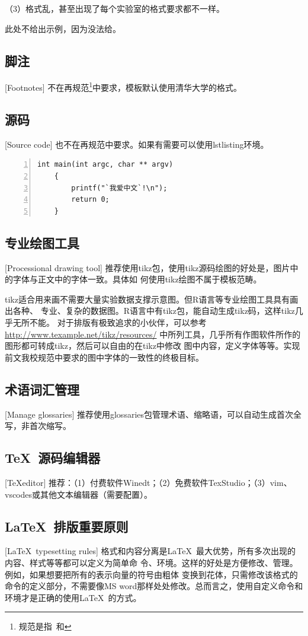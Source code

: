 （3）格式乱，甚至出现了每个实验室的格式要求都不一样。

此处不给出示例，因为没法给。

\subsection{脚注}[Footnotes]
不在再规范\footnote{规范是指\PGR\ 和\UGR}中要求，模板默认使用清华大学的格式。

\subsection{源码}[Source code]
也不在再规范中要求。如果有需要可以使用lstlisting环境。

\begin{lstlisting}[flexiblecolumns,numbers=left,language={[ANSI]C}]
    int main(int argc, char ** argv)
    {
        printf("`我爱中文`!\n");
        return 0;
    }
\end{lstlisting}

\subsection{专业绘图工具}[Processional drawing tool]
\label{drawtool}
推荐使用tikz包，使用tikz源码绘图的好处是，图片中的字体与正文中的字体一致。具体如
何使用tikz绘图不属于模板范畴。

tikz适合用来画不需要大量实验数据支撑示意图。但R语言等专业绘图工具具有画出各种、
专业、复杂的数据图。R语言中有tikz包，能自动生成tikz码，这样tikz几乎无所不能。
对于排版有极致追求的小伙伴，可以参考
\href{http://www.texample.net/tikz/resources/}{http://www.texample.net/tikz/resources/}
中所列工具，几乎所有作图软件所作的图形都可转成tikz，然后可以自由的在tikz中修改
图中内容，定义字体等等。实现前文我校规范中要求的图中字体的一致性的终极目标。


\subsection{术语词汇管理}[Manage glossaries]
推荐使用glossaries包管理术语、缩略语，可以自动生成首次全写，非首次缩写。

\subsection{\TeX\ 源码编辑器}[\TeX editor]
推荐：（1）付费软件Winedt；（2）免费软件TexStudio；（3）vim、vscodes或其他文本编辑器（需要配置）。

\subsection{\LaTeX\ 排版重要原则}[\LaTeX\ typesetting rules]
格式和内容分离是\LaTeX\ 最大优势，所有多次出现的内容、样式等等都可以定义为简单命
令、环境。这样的好处是方便修改、管理。例如，如果想要把所有的表示向量的符号由粗体
变换到花体，只需修改该格式的命令的定义部分，不需要像MS
word那样处处修改。总而言之，使用自定义命令和环境才是正确的使用\LaTeX\ 的方式。


